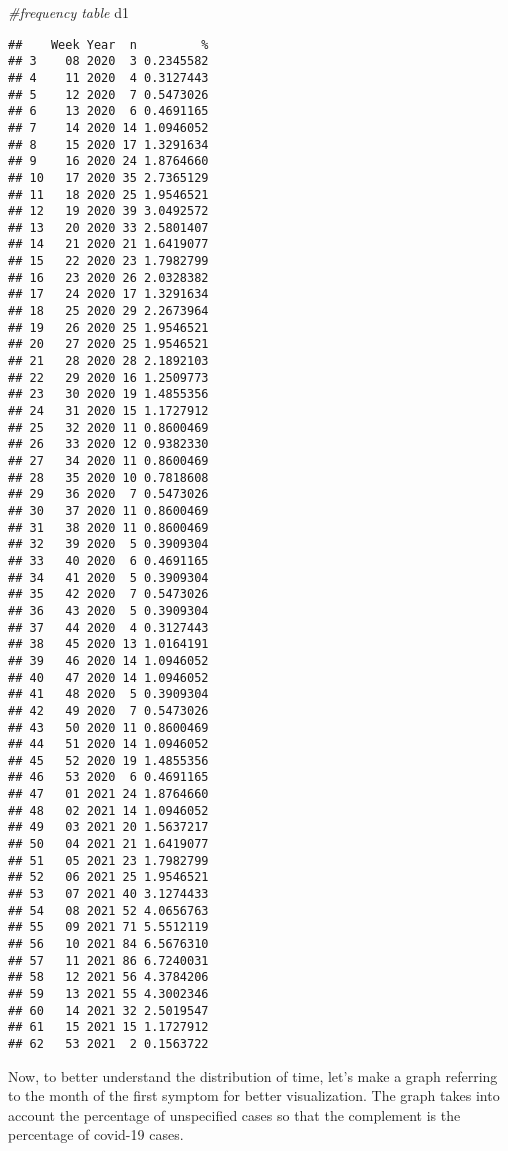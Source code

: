 \documentclass[
]{article}
\newenvironment{Shaded}{\begin{snugshade}}{\end{snugshade}}
\newcommand{\CommentTok}[1]{\textcolor[rgb]{0.56,0.35,0.01}{\textit{#1}}}
\newcommand{\NormalTok}[1]{#1}
\begin{document}
\begin{Shaded}
\begin{Highlighting}[]
\CommentTok{\#frequency table}
\NormalTok{d1}
\end{Highlighting}
\end{Shaded}

\begin{verbatim}
##    Week Year  n         %
## 3    08 2020  3 0.2345582
## 4    11 2020  4 0.3127443
## 5    12 2020  7 0.5473026
## 6    13 2020  6 0.4691165
## 7    14 2020 14 1.0946052
## 8    15 2020 17 1.3291634
## 9    16 2020 24 1.8764660
## 10   17 2020 35 2.7365129
## 11   18 2020 25 1.9546521
## 12   19 2020 39 3.0492572
## 13   20 2020 33 2.5801407
## 14   21 2020 21 1.6419077
## 15   22 2020 23 1.7982799
## 16   23 2020 26 2.0328382
## 17   24 2020 17 1.3291634
## 18   25 2020 29 2.2673964
## 19   26 2020 25 1.9546521
## 20   27 2020 25 1.9546521
## 21   28 2020 28 2.1892103
## 22   29 2020 16 1.2509773
## 23   30 2020 19 1.4855356
## 24   31 2020 15 1.1727912
## 25   32 2020 11 0.8600469
## 26   33 2020 12 0.9382330
## 27   34 2020 11 0.8600469
## 28   35 2020 10 0.7818608
## 29   36 2020  7 0.5473026
## 30   37 2020 11 0.8600469
## 31   38 2020 11 0.8600469
## 32   39 2020  5 0.3909304
## 33   40 2020  6 0.4691165
## 34   41 2020  5 0.3909304
## 35   42 2020  7 0.5473026
## 36   43 2020  5 0.3909304
## 37   44 2020  4 0.3127443
## 38   45 2020 13 1.0164191
## 39   46 2020 14 1.0946052
## 40   47 2020 14 1.0946052
## 41   48 2020  5 0.3909304
## 42   49 2020  7 0.5473026
## 43   50 2020 11 0.8600469
## 44   51 2020 14 1.0946052
## 45   52 2020 19 1.4855356
## 46   53 2020  6 0.4691165
## 47   01 2021 24 1.8764660
## 48   02 2021 14 1.0946052
## 49   03 2021 20 1.5637217
## 50   04 2021 21 1.6419077
## 51   05 2021 23 1.7982799
## 52   06 2021 25 1.9546521
## 53   07 2021 40 3.1274433
## 54   08 2021 52 4.0656763
## 55   09 2021 71 5.5512119
## 56   10 2021 84 6.5676310
## 57   11 2021 86 6.7240031
## 58   12 2021 56 4.3784206
## 59   13 2021 55 4.3002346
## 60   14 2021 32 2.5019547
## 61   15 2021 15 1.1727912
## 62   53 2021  2 0.1563722
\end{verbatim}

Now, to better understand the distribution of time, let's make a graph
referring to the month of the first symptom for better visualization.
The graph takes into account the percentage of unspecified cases so that
the complement is the percentage of covid-19 cases.
\end{document}
